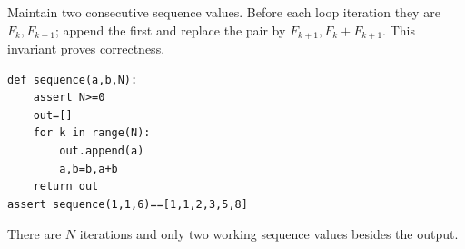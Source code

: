Maintain two consecutive sequence values. Before each loop iteration they are $F_k,F_{k+1}$; append the first and replace the pair by $F_{k+1},F_k+F_{k+1}$. This invariant proves correctness.\begin{verbatim}
def sequence(a,b,N):
    assert N>=0
    out=[]
    for k in range(N):
        out.append(a)
        a,b=b,a+b
    return out
assert sequence(1,1,6)==[1,1,2,3,5,8]
\end{verbatim}
There are $N$ iterations and only two working sequence values besides the output.
